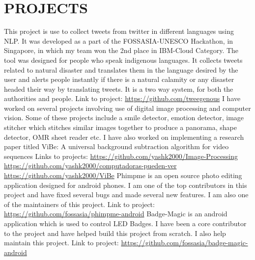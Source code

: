 \documentclass[11pt,a4paper,sans]{moderncv}        %
\begin{document}
\section{PROJECTS}
{This project is use to collect tweets from twitter in different languages using NLP. It was developed as a part of the FOSSASIA-UNESCO Hackathon, in Singapore, in which my team won the 2nd place in IBM-Cloud Category. The tool was designed for people who speak indigenous languages. It collects tweets related to natural disaster and translates them in the language desired by the user and alerts people instantly if there is a natural calamity or any disaster headed their way by translating tweets. It is a two way system, for both the authorities and people.  Link to project:{\newline}
\url{https://github.com/tweegenous}}{}
{I have worked on several projects involving use of digital image processing and computer vision. Some of these projects include a smile detector, emotion detector, image stitcher which stitches similar images together to produce a panorama, shape detector, OMR sheet reader etc. I have also worked on implementing a research paper titled ViBe: A universal background subtraction algorithm for video sequences Links to projects:{\newline} \url{https://github.com/yashk2000/Image-Processing} {\newline} \url{https://github.com/yashk2000/computadoras-pueden-ver} {\newline}  \url{https://github.com/yashk2000/ViBe}}{}  %
{Phimpme is an open source photo editing application designed for android phones. I am one of the top contributors in this project and have fixed several bugs and made several new features. I am also one of the maintainers of this project. Link to project:{\newline} \url{https://github.com/fossasia/phimpme-android}}{}  %
{Badge-Magic is an android application which is used to control LED Badges. I have been a core contributor to the project and have helped build this project from scratch. I also help maintain this project. Link to project:{\newline} \url{https://github.com/fossasia/badge-magic-android}}{}  %
\end{document}
